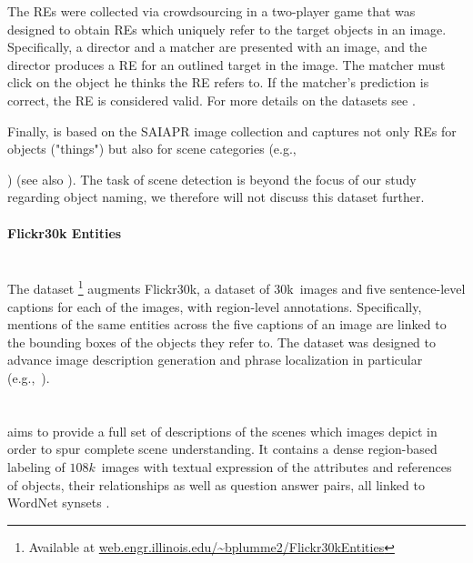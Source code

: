 The REs were collected via crowdsourcing in a two-player game that was designed to obtain REs which uniquely refer to the target objects in an image. 
Specifically, a director and a matcher are presented with an image, and the director produces a RE for an outlined target in the image. 
The matcher must click on the object he thinks the RE refers to. 
If the matcher's prediction is correct, the RE is considered valid. 
For more details on the datasets see \cite{Yu2016}.

Finally,  is based on the SAIAPR image collection \cite{Grubinger2006} %
 and captures not only REs for objects ("things") but also for scene categories (e.g.,{) (see also \cite{hu2015,mao2016generation}). 
The task of scene detection is beyond the focus of our study regarding object naming, we therefore will not discuss this dataset further.

\paragraph{Flickr30k Entities}~\\
The \flickr dataset \cite{plummer2015flickr30kentities}\footnote{Available at  \url{web.engr.illinois.edu/~bplumme2/Flickr30kEntities}}  augments Flickr30k, a dataset of 30k~images and five sentence-level captions for each of the images, with region-level annotations. 
Specifically, mentions of the same entities across the five captions of an image are linked to the bounding boxes of the objects they refer to. 
The dataset was designed to advance image description generation and phrase localization in particular (e.g.,~\cite{rohrbach2016grounding,plummer2017phrase,yeh2018unsupervised}). 
%
%

\paragraph{\vgenome}~\\
\vgenome \cite{krishna2016visualgenome} aims to provide a full set of descriptions of the scenes which images depict in order to spur complete scene understanding. 
It contains a dense region-based labeling of $108k$~images with textual expression of the attributes and references of objects, their relationships as well as question answer pairs, all linked to WordNet synsets \cite[see below]{fellbaum1998wordnet}. 

}
